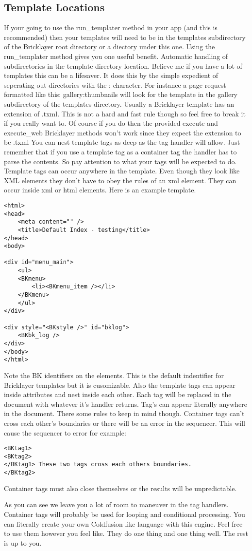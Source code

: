\subsection*{Template Locations}
If your going to use the run\_templater method in your app (and this is recommended) then your templates will need to be in the templates subdirectory of the Bricklayer root directory or a diectory under this one. Using the run\_templater method gives you one useful benefit. Automatic handling of subdirectories in the template directory location. Believe me if you have a lot of templates this can be a lifesaver. It does this by the simple expedient of seperating out directories with the : character. For instance a page request formatted like this: gallery:thumbnails will look for the template in the gallery subdirectory of the templates directory. Usually a Bricklayer template has an extension of .txml. This is not a hard and fast rule though so feel free to break it if you really want to. Of course if you do then the provided execute and execute\_web Bricklayer methods won't work since they expect the extension to be .txml You can nest template tags as deep as the tag handler will allow. Just remember that if you use a template tag as a container tag the handler has to parse the contents. So pay attention to what your tags will be expected to do. Template tags can occur anywhere in the template. Even though they look like XML elements they don't have to obey the rules of an xml element. They can occur inside xml or html elements. Here is an example template.
\begin{verbatim}
<html>
<head> 
	<meta content="" />
	<title>Default Index - testing</title>	
</head>
<body>

<div id="menu_main">
	<ul>
	<BKmenu>
		<li><BKmenu_item /></li>
	</BKmenu>
	</ul>
</div>

<div style="<BKstyle />" id="bklog">
	<BKbk_log />
</div>
</body>
</html>
\end{verbatim}
Note the BK identifiers on the elements. This is the default indentifier for Bricklayer templates but it is cusomizable. Also the template tags can appear inside attributes and nest inside each other. Each tag will be replaced in the document with whatever it's handler returns. Tag's can appear literally anywhere in the document. There some rules to keep in mind though. Container tags can't cross each other's boundaries or there will be an error in the sequencer. This will cause the sequencer to error for example:
\begin{verbatim}
<BKtag1>
<BKtag2>
</BKtag1> These two tags cross each others boundaries.
</BKtag2>
\end{verbatim}
Container tags must also close themselves or the results will be unpredictable.
\par
As you can see we leave you a lot of room to maneuver in the tag handlers.  Container tags will probably be used for looping and conditional processing. You can literally create your own Coldfusion like language with this engine. Feel free to use them however you feel like. They do one thing and one thing well. The rest is up to you.